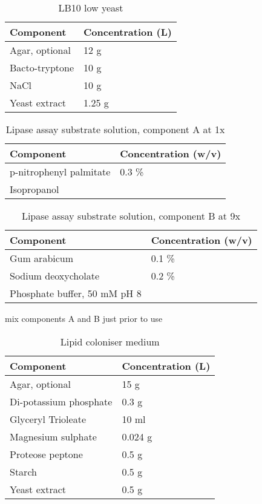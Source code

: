 \documentclass[11pt]{article}
\begin{document}
\begin{table}
\caption{LB10 low yeast}
\begin{tabular}{  p{6.9cm} | p{6.9cm} }
\hline
Component & Concentration (L) \\
\hline
 Agar, optional & 12 g  \\
Bacto-tryptone    & 10 g  \\
   NaCl   & 10 g  \\
    Yeast extract    & 1.25 g \\
  \hline
\end{tabular}
\end{table}

\FloatBarrier
\begin{table}
\caption{Lipase assay substrate solution, component A at 1x}
\begin{tabular}{  p{6.9cm} | p{6.9cm} }
\hline
Component & Concentration (w/v) \\
\hline
 p-nitrophenyl palmitate   & 0.3 \% \\
 Isopropanol &  \\
 \hline
\end{tabular}
\end{table}

\begin{table}
\caption{Lipase assay substrate solution, component B at 9x}
\begin{tabular}{  p{6.9cm} | p{6.9cm} }
\hline
Component & Concentration (w/v) \\
\hline
 Gum arabicum & 0.1 \% \\
  Sodium deoxycholate & 0.2 \% \\
  Phosphate buffer, 50 mM pH 8   &  \\
  \hline
\end{tabular}
\end{table}
\FloatBarrier
mix components A and B just prior to use

\begin{table}
\caption{Lipid coloniser medium}
\begin{tabular}{  p{6.9cm} | p{6.9cm} }
\hline
Component & Concentration (L) \\
\hline
Agar, optional  & 15 g  \\
  Di-potassium phosphate  & 0.3 g \\
   Glyceryl Trioleate   & 10 ml \\
      Magnesium sulphate  & 0.024 g  \\
       Proteose peptone   & 0.5 g \\
          Starch  & 0.5 g \\
           Yeast extract   & 0.5 g \\
  \hline
\end{tabular}
\end{table}
\end{document}
